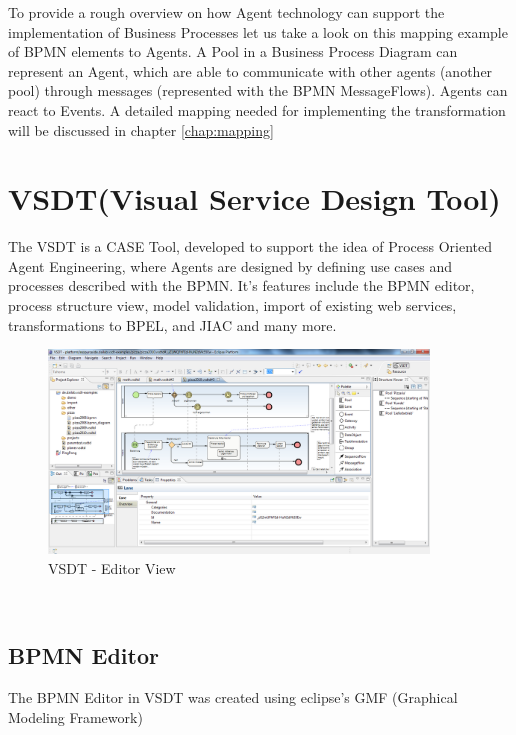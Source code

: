 To provide a rough overview on how Agent technology can support the implementation of Business Processes let us take a look on this mapping example of BPMN elements to Agents. A Pool in a Business Process Diagram can represent an Agent, which are able to communicate with other agents (another pool) through messages (represented with the BPMN MessageFlows). Agents can react to Events. A detailed mapping needed for implementing the transformation will be discussed in chapter \ref{chap:mapping}


\section{VSDT(Visual Service Design Tool)}
\label{sec:vsdt}
The VSDT is a CASE Tool, developed to support the idea of Process Oriented Agent Engineering, where Agents are designed by defining use cases and processes described with the BPMN. It's features include the BPMN editor, process structure view, model validation, import of existing web services, transformations to BPEL, and JIAC and many more. 
\begin{figure}[h]
	\centering
		\includegraphics[width=0.90\textwidth]{images/vsdt_snapshot.png}
	\caption{VSDT - Editor View}
	\label{fig:VSDT}
\end{figure}\\

\subsection{BPMN Editor}
The BPMN Editor in VSDT was created using eclipse's GMF (Graphical Modeling Framework)

